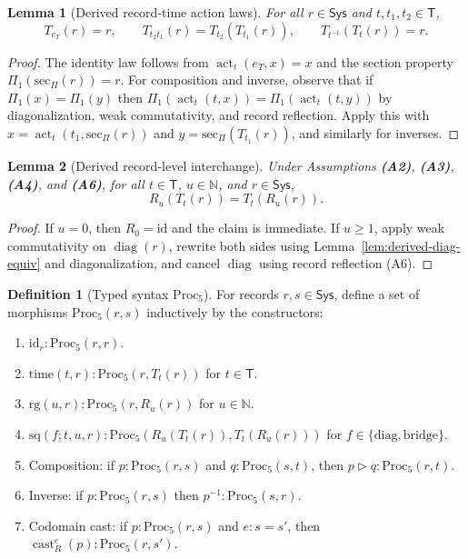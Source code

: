 \documentclass[aps,prl,reprint]{revtex4-2}
\newcommand{\Sys}{\mathsf{Sys}}
\newcommand{\Time}{\mathsf{T}}
\newcommand{\RG}{\mathbb{N}}
\newcommand{\diag}{\operatorname{diag}}
\newcommand{\actT}{\operatorname{act}_t}
\newcommand{\castR}[2]{\operatorname{cast}_R^{#1}\!\left(#2\right)}
\theoremstyle{definition}
\newtheorem{definition}{Definition}[section]
\theoremstyle{plain}
\newtheorem{lemma}{Lemma}[section]
\begin{document}
\begin{lemma}[Derived record-time action laws]
\label{lem:derived-time-laws}
For all $r\in\Sys$ and $t,t_1,t_2\in\Time$,
\[
T_{e_T}(r)=r,\qquad
T_{t_2t_1}(r)=T_{t_2}(T_{t_1}(r)),\qquad
T_{t^{-1}}(T_t(r))=r.
\]
\end{lemma}

\begin{proof}
The identity law follows from $\actT(e_T,x)=x$ and the section property
$\Pi_{1}(\mathrm{sec}_\Pi(r))=r$.
For composition and inverse, observe that if $\Pi_{1}(x)=\Pi_{1}(y)$ then
$\Pi_{1}(\actT(t,x))=\Pi_{1}(\actT(t,y))$ by diagonalization, weak commutativity,
and record reflection. Apply this with
$x=\actT(t_1,\mathrm{sec}_\Pi(r))$ and $y=\mathrm{sec}_\Pi(T_{t_1}(r))$, and similarly
for inverses.
\end{proof}

\begin{lemma}[Derived record-level interchange]
\label{lem:derived-interchange}
Under Assumptions \textbf{(A2)}, \textbf{(A3)}, \textbf{(A4)}, and \textbf{(A6)}, for all
$t\in\Time$, $u\in\RG$, and $r\in\Sys$,
\[
  R_u(T_t(r)) = T_t(R_u(r)).
\]

\end{lemma}

\begin{proof}
If $u=0$, then $R_0=\mathrm{id}$ and the claim is immediate.
If $u\ge 1$, apply weak commutativity on $\diag(r)$, rewrite both sides using
Lemma~\ref{lem:derived-diag-equiv} and diagonalization, and cancel $\diag$ using
record reflection (A6).
\end{proof}

\begin{definition}[Typed syntax $\mathrm{Proc}_5$]
\label{def:Proc5}
For records $r,s\in\Sys$, define a set of morphisms $\mathrm{Proc}_5(r,s)$
inductively by the constructors:
\begin{enumerate}[label=\textbf{(G\arabic*)},leftmargin=*,itemsep=0.4em]
\item $\mathrm{id}_r : \mathrm{Proc}_5(r,r)$.
\item $\mathrm{time}(t,r): \mathrm{Proc}_5(r,T_t(r))$ for $t\in\Time$.
\item $\mathrm{rg}(u,r): \mathrm{Proc}_5(r,R_u(r))$ for $u\in\RG$.
\item $\mathrm{sq}(f;t,u,r): \mathrm{Proc}_5(R_u(T_t(r)),T_t(R_u(r)))$ for
$f\in\{\mathrm{diag},\mathrm{bridge}\}$.
\item Composition: if $p:\mathrm{Proc}_5(r,s)$ and $q:\mathrm{Proc}_5(s,t)$, then
$p\triangleright q:\mathrm{Proc}_5(r,t)$.
\item Inverse: if $p:\mathrm{Proc}_5(r,s)$ then $p^{-1}:\mathrm{Proc}_5(s,r)$.
\item Codomain cast: if $p:\mathrm{Proc}_5(r,s)$ and $e:s=s'$, then
$\castR{e}{p}:\mathrm{Proc}_5(r,s')$.
\end{enumerate}
\end{definition}
\end{document}
